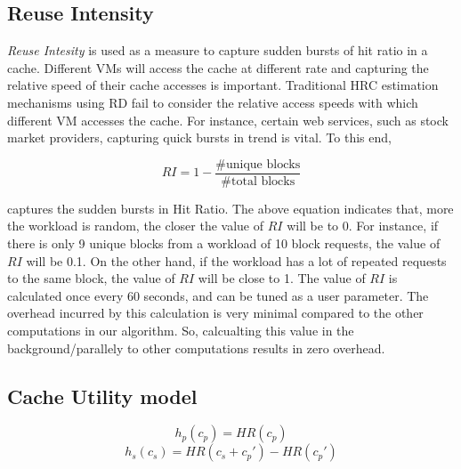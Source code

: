 
 \subsection{Reuse Intensity}

\emph{Reuse Intesity} is used as a measure to capture sudden bursts of hit ratio in a cache. Different VMs will access the cache at different rate and capturing the relative speed of their cache accesses is important. Traditional HRC estimation mechanisms using RD fail to consider the relative access speeds with which different VM accesses the cache. For instance, certain web services, such as stock market providers, capturing quick bursts in trend is vital. To this end, 

\begin{equation}
RI = 1 - \frac{\text{\# unique blocks}}{\text{\# total blocks}}
\label{eq:ri}
\end{equation}

captures the sudden bursts in Hit Ratio. The above equation indicates that, more the workload is random, the closer the value of $RI$ will be to 0. For instance, if there is only 9 unique blocks from a workload of 10 block requests, the value of $RI$ will be 0.1. On the other hand, if the workload has a lot of repeated requests to the same block, the value of $RI$ will be close to 1. The value of $RI$ is calculated once every 60 seconds, and can be tuned as a user parameter. The overhead incurred by this calculation is very minimal compared to the other computations in our algorithm. So, calcualting this value in the background/parallely to other computations results in zero overhead. 

\subsection{Cache Utility model}


$$ h_p(c_p)  = HR(c_p) $$
$$ h_s(c_s)  = HR(c_s + c_p') - HR(c_p') $$

